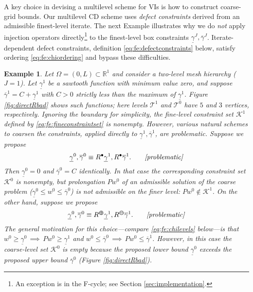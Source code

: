 \documentclass[letterpaper,final,12pt,reqno]{amsart}
\theoremstyle{cstyle}
\theoremstyle{cstyle*}
\theoremstyle{dstyle}
\newtheorem{example}[theorem]{Example}
\numberwithin{equation}{section}
\numberwithin{figure}{section}
\numberwithin{table}{section}
\numberwithin{theorem}{section}
\newcommand{\RR}{\mathbb{R}}
\newcommand{\maxR}{R^{\bm{\oplus}}}
\newcommand{\minR}{R^{\bm{\ominus}}}
\newcommand{\iR}{R^{\bullet}}
\begin{document}
A key choice in devising a multilevel scheme for VIs is how to construct coarse-grid bounds.
Our multilevel CD scheme uses \emph{defect constraints} \cite{GraeserKornhuber2009} derived from an admissible finest-level iterate.  The next Example illustrates why we do \emph{not} apply injection operators directly\footnote{An exception is in the F-cycle; see Section \ref{sec:implementation}.} to the finest-level box constraints $\underline{\gamma}^J,\overline{\gamma}^J$.  Iterate-dependent defect constraints, definition \eqref{eq:fe:defectconstraints} below, satisfy ordering \eqref{eq:fe:chiordering} and bypass these difficulties.

\begin{example}  \label{ex:directRbad}  
Let $\Omega = (0,L) \subset \RR^1$ and consider a two-level mesh hierarchy ($J=1$).  Let $\underline{\gamma}^1$ be a sawtooth function with minimum value zero, and suppose $\overline{\gamma}^1=C+\underline{\gamma}^1$ with $C>0$ strictly less than the maximum of $\underline{\gamma}^1$.  Figure \ref{fig:directRbad} shows such functions; here levels $\mathcal{T}^1$ and $\mathcal{T}^0$ have $5$ and $3$ vertices, respectively.  Ignoring the boundary for simplicity, the fine-level constraint set $\mathcal{K}^1$ defined by \eqref{eq:fe:fineconstraintset} is nonempty.  However, various natural schemes to coarsen the constraints, applied directly to $\underline{\gamma}^1,\overline{\gamma}^1$, are problematic.  Suppose we propose
    $$\underline{\gamma}^0, \overline{\gamma}^0 \equiv \iR \underline{\gamma}^1, \iR \overline{\gamma}^1. \qquad \text{\emph{[problematic]}}$$
Then $\underline{\gamma}^0=0$ and $\overline{\gamma}^0=C$ identically.  In that case the corresponding constraint set $\mathcal{K}^0$ is nonempty, but prolongation $Pw^0$ of an admissible solution of the coarse problem ($\underline{\gamma}^0 \le w^0 \le \overline{\gamma}^0$) is not admissible on the finer level: $Pw^0 \notin \mathcal{K}^1$.  On the other hand, suppose we propose
    $$\underline{\gamma}^0, \overline{\gamma}^0 \equiv \maxR \underline{\gamma}^1, \minR \overline{\gamma}^1. \qquad \text{\emph{[problematic]}}$$
The general motivation for this choice---compare \eqref{eq:fe:chilevels} below---is that $w^0 \ge \underline{\gamma}^0 \, \implies \, Pw^0 \ge \underline{\gamma}^1$ and $w^0 \le \overline{\gamma}^0 \, \implies \, Pw^0 \le \overline{\gamma}^1$.  However, in this case the coarse-level set $\mathcal{K}^0$ is empty because the proposed lower bound $\underline{\gamma}^0$ exceeds the proposed upper bound $\overline{\gamma}^0$ (Figure \ref{fig:directRbad}).
\end{example}
\end{document}
